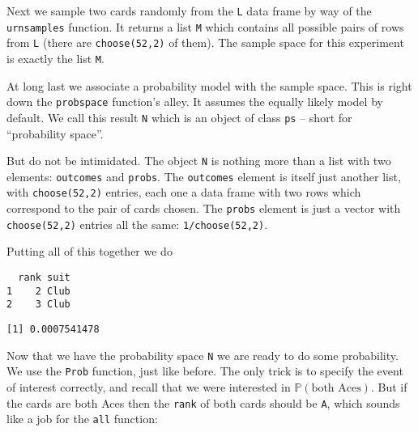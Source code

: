 \documentclass[]{book}
\newenvironment{Shaded}{\begin{snugshade}}{\end{snugshade}}
\newcommand{\KeywordTok}[1]{\textcolor[rgb]{0.13,0.29,0.53}{\textbf{{#1}}}}
\newcommand{\DataTypeTok}[1]{\textcolor[rgb]{0.13,0.29,0.53}{{#1}}}
\newcommand{\DecValTok}[1]{\textcolor[rgb]{0.00,0.00,0.81}{{#1}}}
\newcommand{\StringTok}[1]{\textcolor[rgb]{0.31,0.60,0.02}{{#1}}}
\newcommand{\NormalTok}[1]{{#1}}
\numberwithin{equation}{chapter}
\numberwithin{figure}{chapter}
\theoremstyle{plain}
\theoremstyle{definition}
\theoremstyle{remark}
\theoremstyle{definition}
\theoremstyle{definition}
\theoremstyle{remark}
\begin{document}
Next we sample two cards randomly from the \texttt{L} data frame by way
of the \texttt{urnsamples} function. It returns a list \texttt{M} which
contains all possible pairs of rows from \texttt{L} (there are
\texttt{choose(52,2)} of them). The sample space for this experiment is
exactly the list \texttt{M}.

At long last we associate a probability model with the sample space.
This is right down the \texttt{probspace} function's alley. It assumes
the equally likely model by default. We call this result \texttt{N}
which is an object of class \texttt{ps} -- short for ``probability
space''.

But do not be intimidated. The object \texttt{N} is nothing more than a
list with two elements: \texttt{outcomes} and \texttt{probs}. The
\texttt{outcomes} element is itself just another list, with
\texttt{choose(52,2)} entries, each one a data frame with two rows which
correspond to the pair of cards chosen. The \texttt{probs} element is
just a vector with \texttt{choose(52,2)} entries all the same:
\texttt{1/choose(52,2)}.

Putting all of this together we do

\begin{Shaded}
\end{Shaded}

\begin{verbatim}
  rank suit
1    2 Club
2    3 Club
\end{verbatim}

\begin{verbatim}
[1] 0.0007541478
\end{verbatim}

Now that we have the probability space \texttt{N} we are ready to do
some probability. We use the \texttt{Prob} function, just like before.
The only trick is to specify the event of interest correctly, and recall
that we were interested in \(\mathbb{P}(\mbox{both Aces})\). But if the
cards are both Aces then the \texttt{rank} of both cards should be
\texttt{A}, which sounds like a job for the \texttt{all} function:
\end{document}
